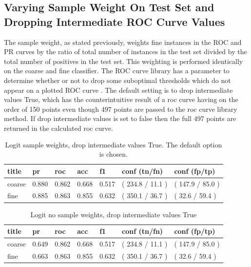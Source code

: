 \documentclass[ms]{nuthesis}
\begin{document}
\subsection{Varying Sample Weight On Test Set and Dropping Intermediate ROC Curve Values}
\par The sample weight, as stated previously, weights fine instances in the ROC and PR curves by the ratio of
total number of instances in the test set divided by the total number of positives in the test set. This
weighting is performed identically on the coarse and fine classifier. The ROC curve library has a parameter to determine
whether or not to drop some suboptimal thresholds which do not appear on a plotted ROC curve \cite{scikit-learn}. The
default setting is to drop intermediate values True, which has the counterintuitive result of a roc curve having on the order of
150 points even though 497 points are passed to the roc curve library method. If drop intermediate values is set to false
then the full 497 points are returned in the calculated roc curve.



\FloatBarrier
\begin{table}[H]
\centering
\caption{Logit sample weights, drop intermediate values True. The default option is chosen.}
\label{tab:LogRegDefSWDropFalse}
\begin{tabular}{|l||l||l||l||l||l||l|}\toprule
title & pr & roc & acc & f1 & conf (tn/fn) & conf (fp/tp) \\ \midrule
coarse & 0.880 & 0.862 & 0.668 & 0.517 & ( 234.8 / 11.1 ) & ( 147.9 / 85.0 ) \\
fine & 0.885 & 0.863 & 0.855 & 0.632 & ( 350.1 / 36.7 ) & ( 32.6 / 59.4 ) \\ \bottomrule
\end{tabular}
\end{table}
\FloatBarrier


\FloatBarrier
\begin{table}[h]
\centering
\caption{Logit no sample weights, drop intermediate values True}
\label{tab:LogReg-NoSW}
\begin{tabular}{|l||l||l||l||l||l||l|}\toprule
title & pr & roc & acc & f1 & conf (tn/fn) & conf (fp/tp) \\ \midrule
coarse & 0.649 & 0.862 & 0.668 & 0.517 & ( 234.8 / 11.1 ) & ( 147.9 / 85.0 ) \\
fine & 0.663 & 0.863 & 0.855 & 0.632 & ( 350.1 / 36.7 ) & ( 32.6 / 59.4 ) \\ \bottomrule
\end{tabular}
\end{table}
\FloatBarrier
\end{document}
